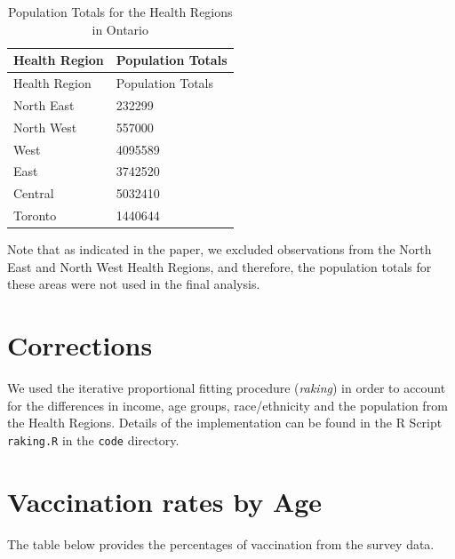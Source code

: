 \documentclass[
  letterpaper,
  DIV=11,
  numbers=noendperiod]{scrartcl}
\begin{document}
\hypertarget{tbl-health-regions}{}
\begin{longtable}[]{@{}ll@{}}
\caption{\label{tbl-health-regions}Population Totals for the Health
Regions in Ontario}\tabularnewline
\toprule()
Health Region & Population Totals \\
\midrule()
\endfirsthead
\toprule()
Health Region & Population Totals \\
\midrule()
\endhead
North East & 232299 \\
North West & 557000 \\
West & 4095589 \\
East & 3742520 \\
Central & 5032410 \\
Toronto & 1440644 \\
\bottomrule()
\end{longtable}

Note that as indicated in the paper, we excluded observations from the
North East and North West Health Regions, and therefore, the population
totals for these areas were not used in the final analysis.

\hypertarget{corrections}{%
\section{Corrections}\label{corrections}}

We used the iterative proportional fitting procedure (\emph{raking}) in
order to account for the differences in income, age groups,
race/ethnicity and the population from the Health Regions. Details of
the implementation can be found in the R Script \texttt{raking.R} in the
\texttt{code} directory.

\hypertarget{vaccination-rates-by-age}{%
\section{Vaccination rates by Age}\label{vaccination-rates-by-age}}

The table below provides the percentages of vaccination from the survey
data.
\end{document}
